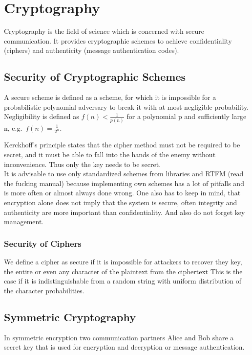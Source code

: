 
\section{Cryptography}
Cryptography is the field of science which is concerned with secure communication.
It provides cryptographic schemes to achieve confidentiality (ciphers) and authenticity (message authentication codes).

\subsection{Security of Cryptographic Schemes}
A secure scheme is defined as a scheme, for which it is impossible for a probabilistic polynomial adversary to break it with at most negligible probability.
Negligibility is defined as $f(n) < \frac{1}{p(n)}$ for a polynomial p and sufficiently large n, e.g.\ $f(n) = \frac{1}{2^n}$.

Kerckhoff's principle states that the cipher method must not be required to be secret, and it must be able to fall into the hands of the enemy without inconvenience.
Thus only the key needs to be secret.\\

It is advisable to use only standardized schemes from libraries and RTFM (read the fucking manual) because implementing own schemes has a lot of pitfalls and is more often or almost always done wrong.
One also has to keep in mind, that encryption alone does not imply that the system is secure, often integrity and authenticity are more important than confidentiality.
And also do not forget key management.

\subsubsection*{Security of Ciphers}
We define a cipher as secure if it is impossible for attackers to recover they key, the entire or even any character of the plaintext from the ciphertext 
This is the case if it is indistinguishable from a random string with uniform distribution of the character probabilities.

\subsection{Symmetric Cryptography}
In symmetric encryption two communication partners Alice and Bob share a secret key that is used for encryption and decryption or message authentication.

